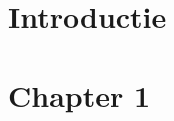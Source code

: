 \documentclass{report}
\begin{document}
\sffamily



\tableofcontents

\newpage

\chapter{Introductie} \label{introductie}

\newpage

\chapter{Chapter 1} \label{chapter_1}

\newpage

\printbibliography
\end{document}
